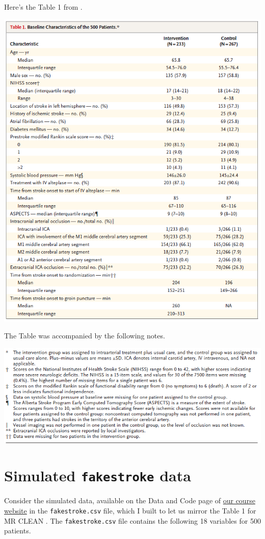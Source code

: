 \documentclass[]{book}
\theoremstyle{definition}
\theoremstyle{definition}
\theoremstyle{definition}
\theoremstyle{remark}
\begin{document}
Here's the Table 1 from \citet{Berkhemer2015}.

\includegraphics[width=0.9\linewidth]{images/Berkhemer-snip4complete}

The Table was accompanied by the following notes.

\includegraphics[width=0.9\linewidth]{images/Berkhemer-snip4notes}

\section{\texorpdfstring{Simulated \texttt{fakestroke}
data}{Simulated fakestroke data}}\label{simulated-fakestroke-data}

Consider the simulated data, available on the Data and Code page of
\href{https://github.com/THOMASELOVE/432-2018}{our course website} in
the \texttt{fakestroke.csv} file, which I built to let us mirror the
Table 1 for MR CLEAN \citep{Berkhemer2015}. The \texttt{fakestroke.csv}
file contains the following 18 variables for 500 patients.
\end{document}
